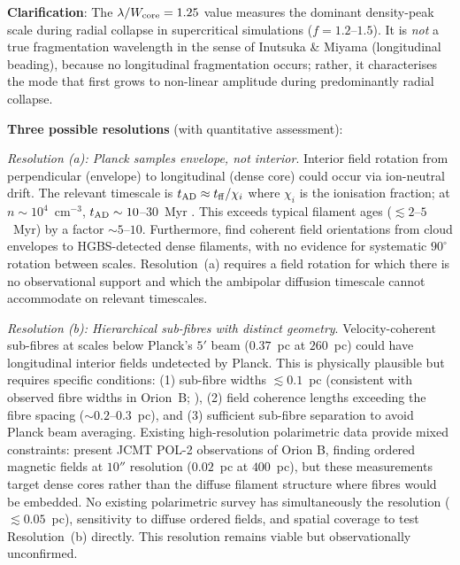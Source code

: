 \documentclass[twoside,twocolumn]{mnras}
\begin{document}
\textbf{Clarification}: The $\lambda/W_{\rm core} = 1.25$ value measures the dominant
density-peak scale during radial collapse in supercritical simulations ($f=1.2$--$1.5$).
It is \textit{not} a true fragmentation wavelength in the sense of Inutsuka \& Miyama
(longitudinal beading), because no longitudinal fragmentation occurs; rather, it
characterises the mode that first grows to non-linear amplitude during predominantly
radial collapse.

\textbf{Three possible resolutions} (with quantitative assessment):

\textit{Resolution (a): Planck samples envelope, not interior}. Interior field rotation
from perpendicular (envelope) to longitudinal (dense core) could occur via ion-neutral
drift. The relevant timescale is $t_{\rm AD} \approx t_{\rm ff}/\chi_i$ where $\chi_i$
is the ionisation fraction; at $n \sim 10^4$~cm$^{-3}$, $t_{\rm AD} \sim 10$--$30$~Myr
\citep{Mouschovias1991, Nakamura2005}. This exceeds typical filament ages ($\lesssim
2$--$5$~Myr) by a factor ${\sim}5$--$10$. Furthermore, \citet{Planck2016} find coherent
field orientations from cloud envelopes to HGBS-detected dense filaments, with no
evidence for systematic $90^\circ$ rotation between scales. Resolution~(a) requires a
field rotation for which there is no observational support and which the ambipolar
diffusion timescale cannot accommodate on relevant timescales.

\textit{Resolution (b): Hierarchical sub-fibres with distinct geometry}. Velocity-coherent
sub-fibres at scales below Planck's $5'$ beam ($0.37$~pc at $260$~pc) could have
longitudinal interior fields undetected by Planck. This is physically plausible but
requires specific conditions: (1) sub-fibre widths ${\lesssim}0.1$~pc (consistent with
observed fibre widths in Orion~B; \citealt{Hacar2013}), (2) field coherence lengths
exceeding the fibre spacing (${\sim}0.2$--$0.3$~pc), and (3) sufficient sub-fibre separation
to avoid Planck beam averaging. Existing high-resolution polarimetric data provide
mixed constraints: \citet{Pattle2018} present JCMT POL-2 observations of Orion B,
finding ordered magnetic fields at $10''$ resolution ($0.02$~pc at $400$~pc), but
these measurements target dense cores rather than the diffuse filament structure where
fibres would be embedded. No existing polarimetric survey has simultaneously the
resolution (${\lesssim}0.05$~pc), sensitivity to diffuse ordered fields, and spatial coverage
to test Resolution~(b) directly. This resolution remains viable but observationally unconfirmed.
\end{document}

